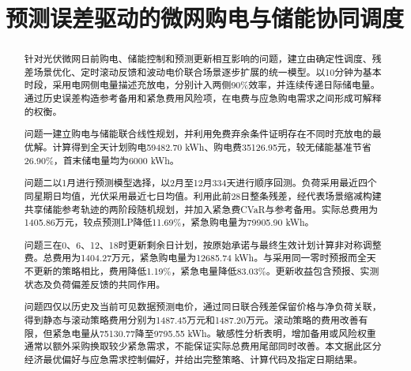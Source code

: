 \documentclass[withoutpreface,bwprint]{cumcmthesis}
\title{预测误差驱动的微网购电与储能协同调度}
\begin{document}
\maketitle
\begin{abstract}
针对光伏微网日前购电、储能控制和预测更新相互影响的问题，建立由确定性调度、残差场景优化、定时滚动反馈和波动电价联合场景逐步扩展的统一模型。以10分钟为基本时段，采用电网侧电量描述充放电，分别计入两侧90\%效率，并连续传递日际储电量。通过历史误差构造参考备用和紧急费用风险项，在电费与应急购电需求之间形成可解释的权衡。

问题一建立购电与储能联合线性规划，并利用免费弃余条件证明存在不同时充放电的最优解。计算得到全天计划购电59482.70 kWh、购电费35126.95元，较无储能基准节省26.90\%，首末储电量均为6000 kWh。

问题二以1月进行预测模型选择，以2月至12月334天进行顺序回测。负荷采用最近四个同星期日均值，光伏采用最近七日均值。利用此前28日整条残差，经代表场景缩减构建共享储能参考轨迹的两阶段随机规划，并加入紧急费CVaR与参考备用。实际总费用为1405.86万元，较点预测LP降低11.69\%，紧急购电量为79905.90 kWh。

问题三在0、6、12、18时更新剩余日计划，按原始承诺与最终生效计划计算非对称调整费。总费用为1404.27万元，紧急购电量为12685.74 kWh。与采用同一零时预报而全天不更新的策略相比，费用降低1.19\%，紧急电量降低83.03\%。更新收益包含预报、实测状态及负荷偏差反馈的共同作用。

问题四仅以历史及当前可见数据预测电价，通过同日联合残差保留价格与净负荷关联，得到静态与滚动策略费用分别为1487.45万元和1487.20万元。滚动策略的费用改善有限，但紧急电量从75130.77降至9795.55 kWh。敏感性分析表明，增加备用或风险权重通常以额外采购换取较少紧急需求，不能保证实际总费用尾部同时改善。本文据此区分经济最优偏好与应急需求控制偏好，并给出完整策略、计算代码及指定日期结果。

\end{abstract}






\FloatBarrier
{}


\clearpage
\begin{appendices}

\end{appendices}
\end{document}
